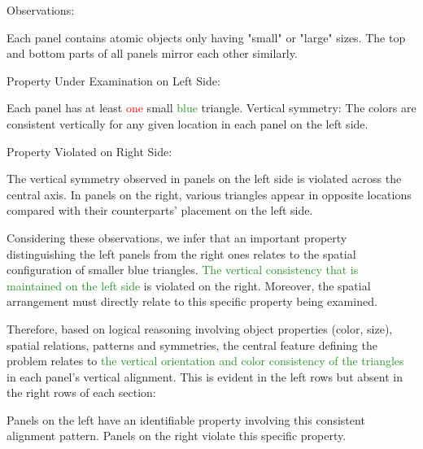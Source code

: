 \begin{tcolorbox}[breakable,enhanced jigsaw,opacityback=0,]
\begin{dialogue}
		Observations:
		
		Each panel contains atomic objects only having "small" or "large" sizes.
		The top and bottom parts of all panels mirror each other similarly.
		
		Property Under Examination on Left Side:
		
		Each panel has at least \textcolor{red}{one} small \textcolor{ForestGreen}{blue} triangle.
		Vertical symmetry: The colors are consistent vertically for any given location in each panel on the left side.
		
		Property Violated on Right Side:
		
		The vertical symmetry observed in panels on the left side is violated across the central axis. In panels on the right, various triangles appear in opposite locations compared with their counterparts' placement on the left side.
		
		Considering these observations, we infer that an important property distinguishing the left panels from the right ones relates to the spatial configuration of smaller blue triangles. \textcolor{ForestGreen}{The vertical consistency that is maintained on the left side} is violated on the right. Moreover, the spatial arrangement must directly relate to this specific property being examined.
		
		Therefore, based on logical reasoning involving object properties (color, size), spatial relations, patterns and symmetries, the central feature defining the problem relates to \textcolor{ForestGreen}{the vertical orientation and color consistency of the triangles} in each panel's vertical alignment. This is evident in the left rows but absent in the right rows of each section:
		
		Panels on the left have an identifiable property involving this consistent alignment pattern.
		Panels on the right violate this specific property.
		\\
	\end{dialogue}
	\label{fig:task12-bongard}
\end{tcolorbox}




